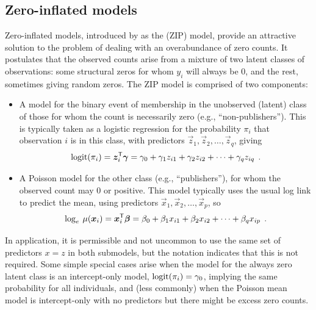 \documentclass[11pt]{book}\usepackage[]{graphicx}\usepackage[]{color}
\begin{document}
\subsection{Zero-inflated models}\label{sec:glm-zip}

Zero-inflated models, introduced by \citet{Lambert:1992} as the 
(ZIP) model, provide an attractive solution to the problem of dealing with an overabundance of
zero counts.  It postulates that the observed counts arise from a mixture of two latent classes
of observations: some structural zeros for whom $y_i$ will always be 0, and the rest, sometimes
giving random zeros.
The ZIP model is comprised of two components:
\begin{itemize}
  \item A model for the binary event of membership in the unobserved (latent) class of
  those for whom the count is necessarily zero (e.g., ``non-publishers'').  
  This is typically taken as a logistic regression for the probability $\pi_i$ that
  observation $i$ is in this class, with predictors $\vec{z}_1, \vec{z}_2, \dots, \vec{z}_q$, giving
\begin{equation}\label{eq:zip-logit}
 \logit (\pi_i) = \vec{z}_i\trans \vec{\gamma}
                = \gamma_0 + \gamma_1 z_{i1} + \gamma_2 z_{i2} + \cdots + \gamma_q z_{iq} \period
\end{equation}

  \item A Poisson model for the other class (e.g., ``publishers''), for whom the observed count may 0 or
  positive. This model typically uses the usual log link to predict the mean, using predictors
  $\vec{x}_1, \vec{x}_2, \dots, \vec{x}_p$, so
\begin{equation}\label{eq:zip-pois}
  \log_e  \: \mu (\bm{x}_i) = \bm{x}_i ^\mathsf{T} \bm{\beta}
                 = \beta_0 + \beta_1 x_{i1} + \beta_2 x_{i2} + \cdots + \beta_q x_{ip} \:\: .
\end{equation}
\end{itemize}
In application, it is permissible and not uncommon to use the same set of predictors
$x = z$ in both submodels, but the notation indicates that this is not required.
Some simple special cases arise when the model for the always zero latent class
is an intercept-only model, $\logit (\pi_i) = \gamma_0$, implying the same probability
for all individuals, and (less commonly) when the Poisson mean model is intercept-only
with no predictors but there might be excess zero counts.
\end{document}
